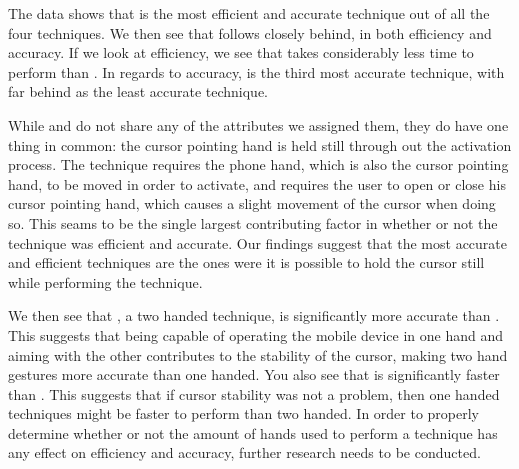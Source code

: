 The data shows that \swipe is the most efficient and accurate technique out of all the four techniques.
We then see that \throw follows closely behind, in both efficiency and accuracy. 
If we look at efficiency, we see that \tilt takes considerably less time to perform than \grab.
In regards to accuracy, \grab is the third most accurate technique, with \tilt far behind as the least accurate technique.

While \swipe and \throw do not share any of the attributes we assigned them, they do have one thing in common: the cursor pointing hand is held still through out the activation process.
The \tilt technique requires the phone hand, which is also the cursor pointing hand, to be moved in order to activate, and \grab requires the user to open or close his cursor pointing hand, which causes a slight movement of the cursor when doing so.
This seams to be the single largest contributing factor in whether or not the technique was efficient and accurate.
Our findings suggest that the most accurate and efficient techniques are the ones were it is possible to hold the cursor still while performing the technique.

We then see that \grab, a two handed technique, is significantly more accurate than \tilt.
This suggests that being capable of operating the mobile device in one hand and aiming with the other contributes to the stability of the cursor, making two hand gestures more accurate than one handed.
You also see that \tilt is significantly faster than \grab.
This suggests that if cursor stability was not a problem, then one handed techniques might be faster to perform than two handed.
In order to properly determine whether or not the amount of hands used to perform a technique has any effect on efficiency and accuracy, further research needs to be conducted. 



